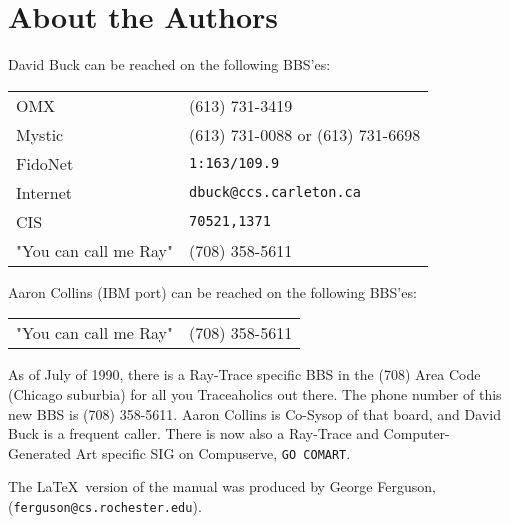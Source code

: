 \chapter{About the Authors}

{\setlength{\parskip}{5pt}
David Buck can be reached on the following BBS'es:

\begin{tabular}{l l}
OMX & (613) 731-3419 \\
Mystic & (613) 731-0088 or (613) 731-6698 \\
FidoNet & {\tt 1:163/109.9} \\
Internet & {\tt dbuck@ccs.carleton.ca} \\
CIS & {\tt 70521,1371} \\
"You can call me Ray" & (708) 358-5611
\end{tabular}

\noindent
Aaron Collins (IBM port) can be reached on the
following BBS'es:

\begin{tabular}{l l}
"You can call me Ray" & (708) 358-5611
\end{tabular}

As of July of 1990, there is a Ray-Trace specific BBS in the (708)
Area Code (Chicago suburbia) for all you Traceaholics out there.  The
phone number of this new BBS is (708) 358-5611.  Aaron Collins is
Co-Sysop of that board, and David Buck is a frequent caller.  There is now
also a Ray-Trace and Computer-Generated Art specific SIG on
Compuserve, {\tt GO COMART}.

The \LaTeX\ version of the manual was produced by George
Ferguson, ({\tt ferguson@cs.rochester.edu}).
}

